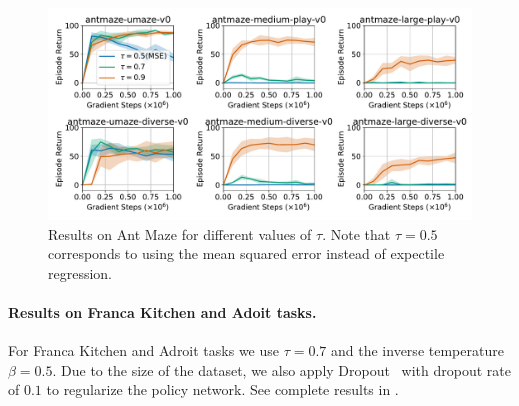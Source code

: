 \begin{figure}
    \centering
    \includegraphics[width=\textwidth]{iql/images/antmaze_full.pdf}
    \caption{Results on Ant Maze for different values of $\tau$. Note that $\tau=0.5$ corresponds to using the mean squared error instead of expectile regression.}
    \label{fig:antmaze_full}
\end{figure}

\begin{table}[ht!]
\centering
\caption{Effect of $\tau$. Fitting $V(s)$ with mean squared error ($\tau=0.5$) is not sufficient to propagate the signal through recursion and fails to solve more challenging medium and large tasks.}\label{tab:antmaze-full}
\end{table}

\paragraph{Results on Franca Kitchen and Adoit tasks.}
For Franca Kitchen and Adroit tasks we use $\tau=0.7$ and the inverse temperature $\beta=0.5$. Due to the size of the dataset, we also apply Dropout~\citep{srivastava2014dropout} with dropout rate of $0.1$ to regularize the policy network. See complete results in .


